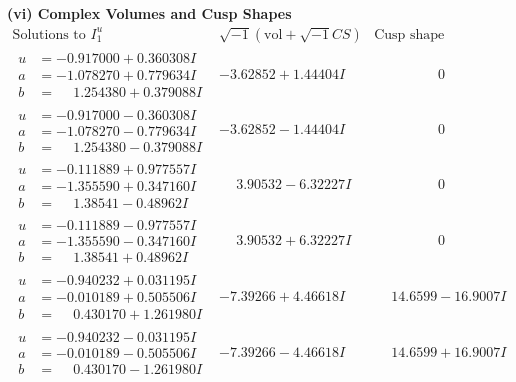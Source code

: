 \documentclass[1p]{elsarticle_modified}
\theoremstyle{definition}
\newcommand{\I}{\sqrt{-1}}
\begin{document}
\newpage\flushleft \textbf{(vi) Complex Volumes and Cusp Shapes}
$$\begin{array}{c|c|c}  
\text{Solutions to }I^u_{1}& \I (\text{vol} + \sqrt{-1}CS) & \text{Cusp shape}\\
 \hline 
\begin{aligned}
u &= -0.917000 + 0.360308 I \\
a &= -1.078270 + 0.779634 I \\
b &= \phantom{-}1.254380 + 0.379088 I\end{aligned}
 & -3.62852 + 1.44404 I & \phantom{-0.000000 } 0 \\ \hline\begin{aligned}
u &= -0.917000 - 0.360308 I \\
a &= -1.078270 - 0.779634 I \\
b &= \phantom{-}1.254380 - 0.379088 I\end{aligned}
 & -3.62852 - 1.44404 I & \phantom{-0.000000 } 0 \\ \hline\begin{aligned}
u &= -0.111889 + 0.977557 I \\
a &= -1.355590 + 0.347160 I \\
b &= \phantom{-}1.38541 - 0.48962 I\end{aligned}
 & \phantom{-}3.90532 - 6.32227 I & \phantom{-0.000000 } 0 \\ \hline\begin{aligned}
u &= -0.111889 - 0.977557 I \\
a &= -1.355590 - 0.347160 I \\
b &= \phantom{-}1.38541 + 0.48962 I\end{aligned}
 & \phantom{-}3.90532 + 6.32227 I & \phantom{-0.000000 } 0 \\ \hline\begin{aligned}
u &= -0.940232 + 0.031195 I \\
a &= -0.010189 + 0.505506 I \\
b &= \phantom{-}0.430170 + 1.261980 I\end{aligned}
 & -7.39266 + 4.46618 I & \phantom{-}14.6599 - 16.9007 I \\ \hline\begin{aligned}
u &= -0.940232 - 0.031195 I \\
a &= -0.010189 - 0.505506 I \\
b &= \phantom{-}0.430170 - 1.261980 I\end{aligned}
 & -7.39266 - 4.46618 I & \phantom{-}14.6599 + 16.9007 I \\ \hline\begin{aligned}

\end{aligned}
\end{array}$$
\end{document}
